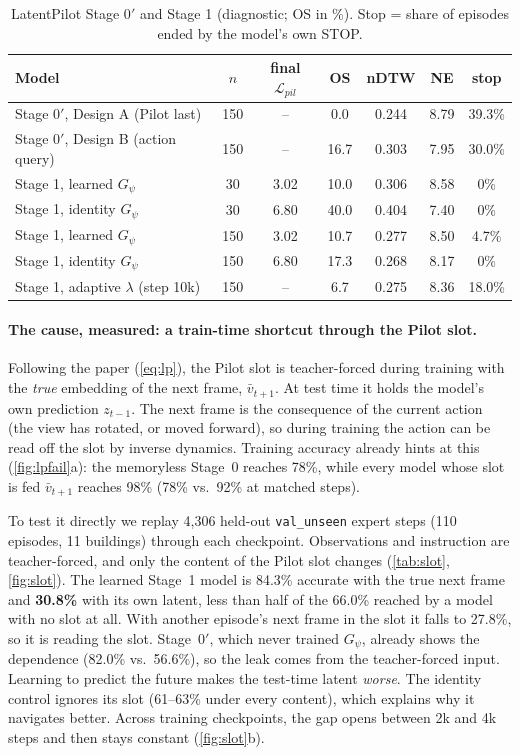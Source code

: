 \documentclass[11pt]{article}
\newcommand{\vbar}{\bar{v}}
\newcommand{\na}{--}
\begin{document}
\begin{table}[t]
\centering\small
\caption{LatentPilot Stage 0$'$ and Stage 1 (diagnostic; OS in \%). Stop = share of episodes ended by the model's
own STOP.}
\label{tab:lp}
\begin{tabular}{lcccccc}
\toprule
Model & $n$ & final $\mathcal{L}_{pil}$ & OS & nDTW & NE & stop \\
\midrule
Stage 0$'$, Design A (Pilot last) & 150 & \na & 0.0 & 0.244 & 8.79 & 39.3\% \\
Stage 0$'$, Design B (action query) & 150 & \na & 16.7 & 0.303 & 7.95 & 30.0\% \\
\midrule
Stage 1, learned $G_\psi$ & 30 & 3.02 & 10.0 & 0.306 & 8.58 & 0\% \\
Stage 1, identity $G_\psi$ & 30 & 6.80 & 40.0 & 0.404 & 7.40 & 0\% \\
Stage 1, learned $G_\psi$ & 150 & 3.02 & 10.7 & 0.277 & 8.50 & 4.7\% \\
Stage 1, identity $G_\psi$ & 150 & 6.80 & 17.3 & 0.268 & 8.17 & 0\% \\
Stage 1, adaptive $\lambda$ (step 10k) & 150 & \na & 6.7 & 0.275 & 8.36 & 18.0\% \\
\bottomrule
\end{tabular}
\end{table}

\paragraph{The cause, measured: a train-time shortcut through the Pilot slot.}
Following the paper (\cref{eq:lp}), the Pilot slot is teacher-forced during training with the \emph{true} embedding of
the next frame, $\vbar_{t+1}$. At test time it holds the model's own prediction $z_{t-1}$. The next frame is the
consequence of the current action (the view has rotated, or moved forward), so during training the action can be read
off the slot by inverse dynamics. Training accuracy already hints at this (\cref{fig:lpfail}a): the memoryless Stage~0
reaches 78\%, while every model whose slot is fed $\vbar_{t+1}$ reaches 98\% (78\% vs.\ 92\% at matched steps).

To test it directly we replay 4,306 held-out \texttt{val\_unseen} expert steps (110 episodes, 11 buildings) through each
checkpoint. Observations and instruction are teacher-forced, and only the content of the Pilot slot changes
(\cref{tab:slot}, \cref{fig:slot}). The learned Stage~1 model is 84.3\% accurate with the true next frame and
\textbf{30.8\%} with its own latent, less than half of the 66.0\% reached by a model with no slot at all. With another
episode's next frame in the slot it falls to 27.8\%, so it is reading the slot. Stage~0$'$, which never trained
$G_\psi$, already shows the dependence (82.0\% vs.\ 56.6\%), so the leak comes from the teacher-forced input. Learning to
predict the future makes the test-time latent \emph{worse}. The identity control ignores its slot (61--63\% under
every content), which explains why it navigates better. Across training checkpoints, the gap opens between 2k and 4k
steps and then stays constant (\cref{fig:slot}b).
\end{document}
